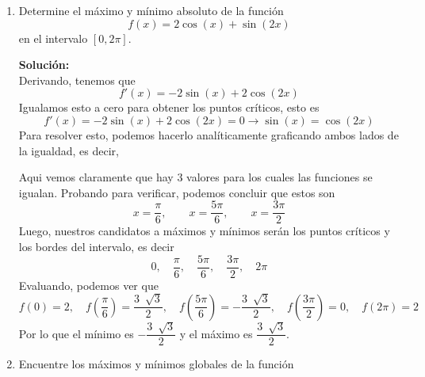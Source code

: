 \documentclass[12pt]{article}
\newenvironment{solucion}
{\begin{mdframed}[backgroundcolor=black!10]
		{\bf Solución:}\\
	}
	{
	\end{mdframed}
}
\newenvironment{preguntas}
{\begin{enumerate}\itemsep12pt
	}
	{
	\end{enumerate}
}
\newcommand{\ra}{\rightarrow}
\begin{document}
\begin{preguntas}
\begin{solucion}
\begin{enumerate}[a)]
Ahora, derivamos nuevamente para clasíficar nuestro punto crítico,
$$f''(x) = 
\dfrac{2(x^2-1) - 4x^2}{(x^2-1)^2} = 
\dfrac{-2 - 2x^2}{(x^2-1)^2} < 0$$
$f''(x)$ es negativa para todo $x$, por lo que $x = -1 - \sqrt[]{2}$ es un máximo local.
\end{enumerate}
\end{solucion}
\item Determine el máximo y mínimo absoluto de la función 
$$f(x) = 2\cos (x) + \sin (2x)$$
en el intervalo $[0, 2\pi]$.
\begin{solucion}
Derivando, tenemos que
$$f'(x) = -2 \sin(x) + 2 \cos(2x)$$
Igualamos esto a cero para obtener los puntos críticos, esto es
$$f'(x) = -2 \sin(x) + 2 \cos(2x) = 0 \ra \sin(x) = \cos(2x)$$
Para resolver esto, podemos hacerlo analíticamente graficando ambos lados de la igualdad, es decir,
\begin{center}
\end{center}
Aqui vemos claramente que hay 3 valores para los cuales las funciones se igualan. Probando para verificar, podemos concluir que estos son
$$x = \dfrac{\pi}{6}, \qquad x = \dfrac{5\pi}{6}, \qquad x = \dfrac{3\pi}{2}$$
Luego, nuestros candidatos a máximos y mínimos serán los puntos críticos y los bordes del intervalo, es decir
$$0, \quad \dfrac{\pi}{6}, \quad \dfrac{5\pi}{6}, \quad \dfrac{3\pi}{2}, \quad 2\pi$$
Evaluando, podemos ver que
$$f(0) = 2, \quad f(\dfrac{\pi}{6}) = \dfrac{3\ \sqrt[]{3}}{2}, \quad f(\dfrac{5\pi}{6}) = -\dfrac{3\ \sqrt[]{3}}{2}, \quad f(\dfrac{3\pi}{2}) = 0, \quad f(2\pi) = 2$$
Por lo que el mínimo es $-\dfrac{3\ \sqrt[]{3}}{2}$ y el máximo es $\dfrac{3\ \sqrt[]{3}}{2}$.
\end{solucion}
\item Encuentre los máximos y mínimos globales de la función

\end{preguntas}
\end{document}
